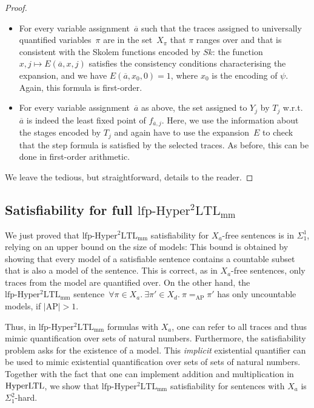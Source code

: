 \documentclass[dvipsnames,10pt,a4paper]{amsart}
\theoremstyle{definition}
\theoremstyle{remark}
\newcommand{\size}[1]{|#1|}
\newcommand{\hyltl}{\mathrm{Hyper\-LTL}\xspace}
\newcommand{\lfpsohyltlfp}{\mathrm{lfp\text{-}{Hyper^2LTL_{\mathrm{mm}}}}\xspace}
\newcommand{\ap}[0]{\mathrm{AP}}
\newcommand{\univar}{X_a}
\newcommand{\unidisvar}{X_d}
\newcommand{\skolem}{\mathit{Sk}}
\newcommand{\equals}[3]{#1 =_{#3} #2}
\begin{document}
\begin{proof}
\begin{itemize}
    \item For every variable assignment~$\overline{a}$ such that the traces assigned to universally quantified variables~$\pi$ are in the set~$X_\pi$ that $\pi$ ranges over and that is consistent with the Skolem functions encoded by $\skolem$: the function~$x,j\mapsto E(\overline{a}, x, j)$ satisfies the consistency conditions characterising the expansion, and we have $E(\overline{a},x_0, 0) = 1$, where $x_0$ is the encoding of $\psi$. 
    Again, this formula is first-order.

    \item For every variable assignment~$\overline{a}$ as above, the set assigned to $Y_j$ by $T_j$ w.r.t.\ $\overline{a}$ is indeed the least fixed point of $f_{\overline{a},j}$. Here, we use the information about the stages encoded by $T_j$ and again have to use the expansion~$E$ to check that the step formula is satisfied by the selected traces. As before, this can be done in first-order arithmetic.
\end{itemize}
We leave the tedious, but straightforward, details to the reader.
\end{proof}

\subsection{\texorpdfstring{Satisfiability for full \boldmath$\lfpsohyltlfp$}{Satisfiability for full Second-order HyperLTL with Least Fixed Points}}

We just proved that $\lfpsohyltlfp$ satisfiability for $\univar$-free sentences is in $\Sigma_1^1$, relying on an upper bound on the size of models: 
This bound is obtained by showing that every model of a satisfiable sentence contains a countable subset that is also a model of the sentence.
This is correct, as in $\univar$-free sentences, only traces from the model are quantified over.
On the other hand, the $\lfpsohyltlfp$ sentence~$\forall \pi \in \univar.\ \exists \pi'\in\unidisvar.\ \equals{\pi}{\pi'}{\ap}$ has only uncountable models, if $\size{\ap}>1$.

Thus, in $\lfpsohyltlfp$ formulas with $\univar$, one can refer to all traces and thus mimic quantification over sets of natural numbers. 
Furthermore, the satisfiability problem asks for the existence of a model. This \emph{implicit} existential quantifier can be used to mimic existential quantification over sets of sets of natural numbers.
Together with the fact that one can implement addition and multiplication in $\hyltl$, we show that $\lfpsohyltlfp$ satisfiability for sentences with $\univar$ is $\Sigma_1^2$-hard.
\end{document}
